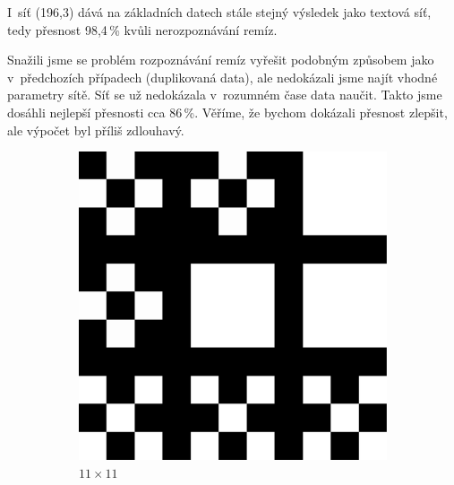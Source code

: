 \documentclass[10pt,a4paper]{article}
\begin{document}
I~síť (196,3) dává na základních datech stále stejný výsledek jako textová síť, tedy přesnost 98,4\,\% kvůli nerozpoznávání remíz. 

Snažili jsme se problém rozpoznávání remíz vyřešit podobným způsobem jako v~předchozích případech (duplikovaná data), ale nedokázali jsme najít vhodné parametry sítě. Síť se už nedokázala v~rozumném čase data naučit. Takto jsme dosáhli nejlepší přesnosti cca 86\,\%. Věříme, že bychom dokázali přesnost zlepšit, ale výpočet byl příliš zdlouhavý.

\begin{figure}[h!]
\centering
\begin{subfigure}{.5\textwidth}
  \centering
  \includegraphics[scale=0.1]{vzor11}
  \caption{$11\times 11$}
  \label{fig:v1}
\end{subfigure}%
\begin{subfigure}{.5\textwidth}
  \centering

\end{subfigure}
\end{figure}
\end{document}
